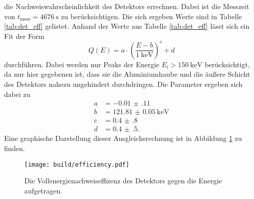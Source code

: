 die Nachweiswahrscheinlichkeit des Detektors errechnen. Dabei ist die Messzeit von $t_\text{mess} = \SI{4676}{\second}$
zu berücksichtigen. Die sich ergeben Werte sind in Tabelle \ref{tab:det_eff} gelistet.
Anhand der Werte aus Tabelle \ref{tab:det_eff} lässt sich ein Fit der Form
\begin{equation}
  \label{eqn:Potenz}
  Q(E) = a \cdot \left(\frac{E-b}{\SI{1}{\kilo\electronvolt}}\right)^c + d
\end{equation}
durchführen. Dabei werden nur Peaks der Energie $E_\text{i} > \SI{150}{\kilo\electronvolt}$ berücksichtigt,
da nur hier gegebenen ist, dass sie die Aluminiumhaube und die äußere Schicht des Detektors nahezu
ungehindert durchdringen. Die Parameter ergeben sich dabei zu
\begin{align*}
  a &= \num{-0.01(11)} \\
  b &= \SI{121.81(5)}{\kilo\electronvolt} \\
  c &= \num{0.4(8)} \\
  d &= \num{0.4(5)}.
\end{align*}
Eine graphische Darstellung dieser Ausgleichsrechnung ist in Abbildung \ref{fig:effizenz} zu finden.

\begin{figure}[htb]
 \centering
 \texttt{[image: build/efficiency.pdf]}
 \caption{Die Vollenergienachweiseffizenz des Detektors gegen die Energie aufgetragen.}
 \label{fig:effizenz}
\end{figure}

\FloatBarrier


